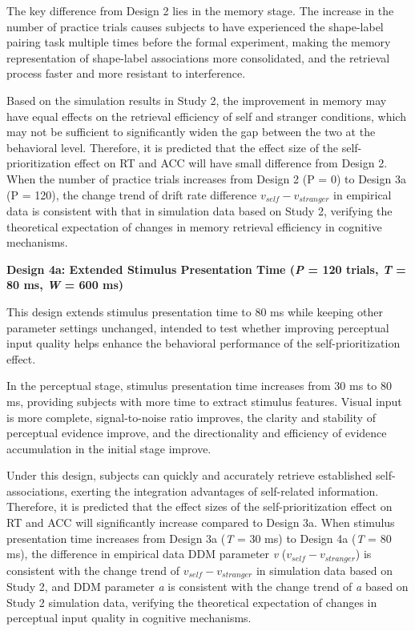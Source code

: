 \documentclass[
  english,
  man,floatsintext]{apa6}
\begin{document}
The key difference from Design 2 lies in the memory stage. The increase in the number of practice trials causes subjects to have experienced the shape-label pairing task multiple times before the formal experiment, making the memory representation of shape-label associations more consolidated, and the retrieval process faster and more resistant to interference.

Based on the simulation results in Study 2, the improvement in memory may have equal effects on the retrieval efficiency of self and stranger conditions, which may not be sufficient to significantly widen the gap between the two at the behavioral level. Therefore, it is predicted that the effect size of the self-prioritization effect on RT and ACC will have small difference from Design 2. When the number of practice trials increases from Design 2 (P = 0) to Design 3a (P = 120), the change trend of drift rate difference \(v_{self} - v_{stranger}\) in empirical data is consistent with that in simulation data based on Study 2, verifying the theoretical expectation of changes in memory retrieval efficiency in cognitive mechanisms.

\textbf{Design 4a: Extended Stimulus Presentation Time (\emph{P} = 120 trials, \emph{T} = 80 ms, \emph{W} = 600 ms)}

This design extends stimulus presentation time to 80 ms while keeping other parameter settings unchanged, intended to test whether improving perceptual input quality helps enhance the behavioral performance of the self-prioritization effect.

In the perceptual stage, stimulus presentation time increases from 30 ms to 80 ms, providing subjects with more time to extract stimulus features. Visual input is more complete, signal-to-noise ratio improves, the clarity and stability of perceptual evidence improve, and the directionality and efficiency of evidence accumulation in the initial stage improve.

Under this design, subjects can quickly and accurately retrieve established self-associations, exerting the integration advantages of self-related information. Therefore, it is predicted that the effect sizes of the self-prioritization effect on RT and ACC will significantly increase compared to Design 3a. When stimulus presentation time increases from Design 3a (\emph{T} = 30 ms) to Design 4a (\emph{T} = 80 ms), the difference in empirical data DDM parameter \emph{v} (\(v_{self} - v_{stranger}\)) is consistent with the change trend of \(v_{self} - v_{stranger}\) in simulation data based on Study 2, and DDM parameter \emph{a} is consistent with the change trend of \emph{a} based on Study 2 simulation data, verifying the theoretical expectation of changes in perceptual input quality in cognitive mechanisms.
\end{document}
